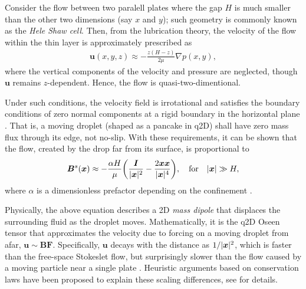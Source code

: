 \medskip
Consider the flow between two paralell plates where the gap $H$ is much smaller than the other two dimensions (say $x$ and $y$); such geometry is commonly known as the \emph{Hele Shaw cell}. Then, from the lubrication theory, the velocity of the flow within the thin layer is approximately prescribed as 
 \begin{equation} \label{eq:hele-shaw}
  \begin{aligned}
    {\bm u}(x,y,z) \approx -\frac{z(H-z)}{2\mu} \nabla p(x,y),
  \end{aligned}
 \end{equation}
where the vertical components of the velocity and pressure are neglected, though ${\bm u}$ remains $z$-dependent. Hence, the flow is quasi-two-dimentional.

Under such conditions, the velocity field is irrotational and satisfies the boundary conditions of zero normal components at a rigid boundary in the horizontal plane \citep{Batchelor}. That is, a moving droplet (shaped as a pancake in q2D) shall have zero mass flux through its edge, not no-slip. With these requirements, it can be shown that the flow, created by the drop far from its surface, is proportional to
\begin{equation} \label{eq:dipolar}
 \begin{aligned}
   {\bm B}^s({\bm x}) \approx -\frac{\alpha H}{\mu} \bigg( \frac{{\bm I}}{\lvert\bm x\rvert^2} -\frac{ 2{\bm x}{\bm x} }{ \lvert{\bm x}\rvert^4} \bigg),
   \quad \textrm{for} \quad \lvert\bm x\rvert \gg H,
 \end{aligned}
\end{equation}
where $\alpha$ is a dimensionless prefactor depending on the confinement \citep{Diamant}.

Physically, the above equation describes a 2D \emph{mass dipole} that displaces the surrounding fluid as the droplet moves.
Mathematically, it is the q2D Oseen tensor that approximates the velocity due to forcing on a moving droplet from afar, \ie ${\bm u} \sim {\bm B}{\bm F}$.
Specifically, ${\bm u}$ decays with the distance as $1/\lvert\bm x\rvert^2$, which is faster than the free-space Stokeslet flow, but surprisingly slower than the flow caused by a moving particle near a single plate \citep{Cui2004}.
Heuristic arguments based on conservation laws have been proposed to explain these scaling differences, see \cite{Diamant} for details.

